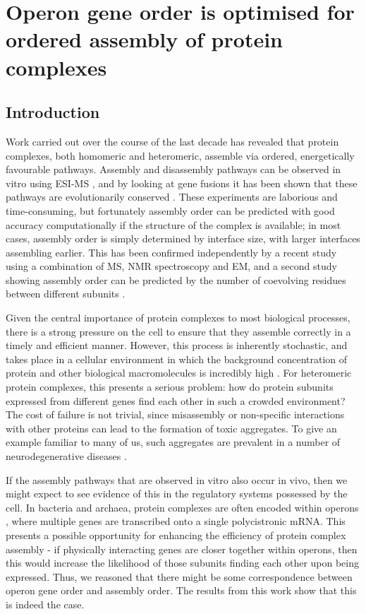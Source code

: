 \documentclass[a4paper,11pt,twoside,openright]{scrbook}
\begin{document}
\chapter{Operon gene order is optimised for ordered assembly of protein complexes}\label{chapter:operons}

\section{Introduction}
Work carried out over the course of the last decade has revealed that protein complexes, both homomeric and heteromeric, assemble via ordered, energetically favourable pathways. Assembly and disassembly pathways can be observed in vitro using ESI-MS \cite{Hernandez2007}, and by looking at gene fusions it has been shown that these pathways are evolutionarily conserved \cite{Levy2008,Marsh2013}. These experiments are laborious and time-consuming, but fortunately assembly order can be predicted with good accuracy computationally if the structure of the complex is available; in most cases, assembly order is simply determined by interface size, with larger interfaces assembling earlier. This has been confirmed independently by a recent study using a combination of MS, NMR spectroscopy and EM, and a second study showing assembly order can be predicted by the number of coevolving residues between different subunits \cite{Macek2017,Mallik2017}.

Given the central importance of protein complexes to most biological processes, there is a strong pressure on the cell to ensure that they assemble correctly in a timely and efficient manner. However, this process is inherently stochastic, and takes place in a cellular environment in which the background concentration of protein and other biological macromolecules is incredibly high \cite{Swain2002}. For heteromeric protein complexes, this presents a serious problem: how do protein subunits expressed from different genes find each other in such a crowded environment? The cost of failure is not trivial, since misassembly or non-specific interactions with other proteins can lead to the formation of toxic aggregates. To give an example familiar to many of us, such aggregates are prevalent in a number of neurodegenerative diseases \cite{Ross2004a}.

If the assembly pathways that are observed in vitro also occur in vivo, then we might expect to see evidence of this in the regulatory systems possessed by the cell. In bacteria and archaea, protein complexes are often encoded within operons \cite{Mushegian1996,Dandekar1998}, where multiple genes are transcribed onto a single polycistronic mRNA. This presents a possible opportunity for enhancing the efficiency of protein complex assembly - if physically interacting genes are closer together within operons, then this would increase the likelihood of those subunits finding each other upon being expressed. Thus, we reasoned that there might be some correspondence between operon gene order and assembly order. The results from this work show that this is indeed the case.
\end{document}
